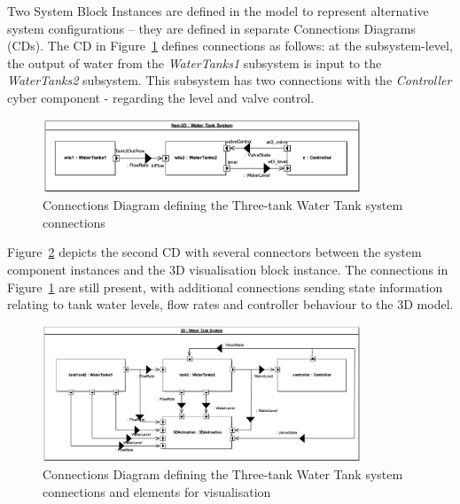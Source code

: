 Two System Block Instances are defined in the model to represent alternative system configurations -- they are defined in separate Connections Diagrams (CDs). The CD in Figure~\ref{fig:threetankcd} defines connections as follows: at the subsystem-level,  the output of water from the \emph{WaterTanks1} subsystem is input to the \emph{WaterTanks2} subsystem. This subsystem has two connections with the \emph{Controller} cyber component - regarding the level and valve control.

\begin{figure}[htbp]
\begin{center}
\includegraphics[width=0.85\textwidth]{threetank/ttwt_cd.png}
\caption{Connections Diagram defining the Three-tank Water Tank system connections}
\label{fig:threetankcd}
\end{center}
\end{figure}

 Figure~\ref{fig:threetankcdvis} depicts the second CD with several connectors between the system component instances and the 3D visualisation block instance. The connections in Figure~\ref{fig:threetankcd} are still present, with additional connections sending state information relating to tank water levels, flow rates and controller behaviour to the 3D model.
 
\begin{figure}[htbp]
\begin{center}
\includegraphics[width=0.85\textwidth]{threetank/ttwt_cd_vis.png}
\caption{Connections Diagram defining the Three-tank Water Tank system connections and elements for visualisation}
\label{fig:threetankcdvis}
\end{center}
\end{figure}

